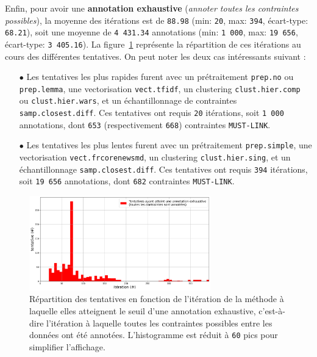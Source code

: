 			Enfin, pour avoir une \textbf{annotation exhaustive} (\textit{annoter toutes les contraintes possibles}), la moyenne des itérations est de \texttt{88.98} (min: \texttt{20}, max: \texttt{394}, écart-type: \texttt{68.21}), soit une moyenne de \texttt{4 431.34} annotations (min: \texttt{1 000}, max: \texttt{19 656}, écart-type: \texttt{3 405.16}).
			La figure~\ref{figure:4.2.1-ETUDE-OPTIMISATION-HISTOGRAMME-ANNOTATION-EXHAUSTIVE} représente la répartition de ces itérations au cours des différentes tentatives.
			On peut noter les deux cas intéressants suivant :
			\begin{itemize}
				\item[\(\bullet\)] Les tentatives les plus rapides furent avec un prétraitement \texttt{prep.no} ou \texttt{prep.lemma}, une vectorisation \texttt{vect.tfidf}, un clustering \texttt{clust.hier.comp} ou \texttt{clust.hier.wars}, et un échantillonnage de contraintes \texttt{samp.closest.diff}. Ces tentatives ont requis \texttt{20} itérations, soit \texttt{1 000} annotations, dont \texttt{653} (respectivement \texttt{668}) contraintes \texttt{MUST-LINK}.
				\item[\(\bullet\)] Les tentatives les plus lentes furent avec un prétraitement \texttt{prep.simple}, une vectorisation \texttt{vect.frcorenewsmd}, un clustering \texttt{clust.hier.sing}, et un échantillonnage \texttt{samp.closest.diff}. Ces tentatives ont requis \texttt{394} itérations, soit \texttt{19 656} annotations, dont \texttt{682} contraintes \texttt{MUST-LINK}.
			\end{itemize}
			\begin{figure}[H]
				\centering
				\includegraphics[width=0.7\textwidth]{figures/etude-efficience-histogramme-annotation-exhaustive}
				\caption{Répartition des tentatives en fonction de l'itération de la méthode à laquelle elles atteignent le seuil d'une annotation exhaustive, c'est-à-dire l'itération à laquelle toutes les contraintes possibles entre les données ont été annotées. L'histogramme est réduit à \texttt{60} pics pour simplifier l'affichage.}
				\label{figure:4.2.1-ETUDE-OPTIMISATION-HISTOGRAMME-ANNOTATION-EXHAUSTIVE}
			\end{figure}
